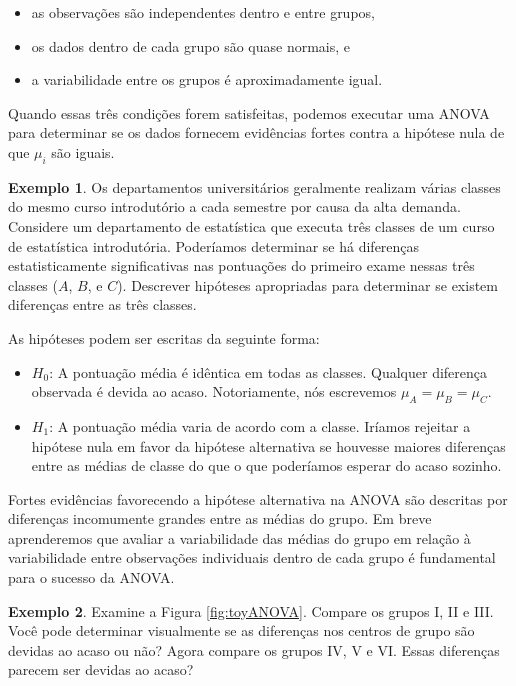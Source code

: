 \documentclass[
]{book}
\theoremstyle{definition}
\theoremstyle{definition}
\newtheorem{example}{Exemplo}[chapter]
\theoremstyle{definition}
\theoremstyle{definition}
\theoremstyle{remark}
\begin{document}
\begin{itemize}
\item
  as observações são independentes dentro e entre grupos,
\item
  os dados dentro de cada grupo são quase normais, e
\item
  a variabilidade entre os grupos é aproximadamente igual.
\end{itemize}

Quando essas três condições forem satisfeitas, podemos executar uma ANOVA para determinar se os dados fornecem evidências fortes contra a hipótese nula de que \(\mu_i\) são iguais.

\begin{example}
\protect\hypertarget{exm:firstExampleForThreeStatisticsClassesAndANOVA}{}{\label{exm:firstExampleForThreeStatisticsClassesAndANOVA} }Os departamentos universitários geralmente realizam várias classes do mesmo curso introdutório a cada semestre por causa da alta demanda. Considere um departamento de estatística que executa três classes de um curso de estatística introdutória. Poderíamos determinar se há diferenças estatisticamente significativas nas pontuações do primeiro exame nessas três classes (\(A\), \(B\), e \(C\)). Descrever hipóteses apropriadas para determinar se existem diferenças entre as três classes.
\end{example}

As hipóteses podem ser escritas da seguinte forma:

\begin{itemize}
\item
  \(H_0\): A pontuação média é idêntica em todas as classes. Qualquer diferença observada é devida ao acaso. Notoriamente, nós escrevemos \(\mu_A=\mu_B=\mu_C\).
\item
  \(H_1\): A pontuação média varia de acordo com a classe. Iríamos rejeitar a hipótese nula em favor da hipótese alternativa se houvesse maiores diferenças entre as médias de classe do que o que poderíamos esperar do acaso sozinho.
\end{itemize}

Fortes evidências favorecendo a hipótese alternativa na ANOVA são descritas por diferenças incomumente grandes entre as médias do grupo. Em breve aprenderemos que avaliar a variabilidade das médias do grupo em relação à variabilidade entre observações individuais dentro de cada grupo é fundamental para o sucesso da ANOVA.

\begin{example}
\protect\hypertarget{exm:unnamed-chunk-220}{}{\label{exm:unnamed-chunk-220} }Examine a Figura \ref{fig:toyANOVA}. Compare os grupos I, II e III. Você pode determinar visualmente se as diferenças nos centros de grupo são devidas ao acaso ou não? Agora compare os grupos IV, V e VI. Essas diferenças parecem ser devidas ao acaso?
\end{example}
\end{document}
